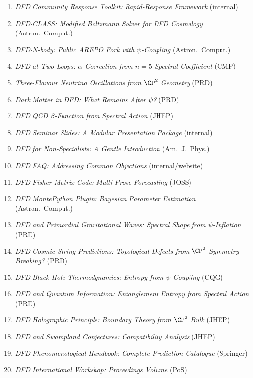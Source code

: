\documentclass[11pt,a4paper]{article}
\begin{document}
\begin{enumerate}[nosep]
\item \textit{DFD Community Response Toolkit: Rapid-Response Framework} (internal)
\item \textit{DFD-CLASS: Modified Boltzmann Solver for DFD Cosmology} (Astron.\ Comput.)
\item \textit{DFD-N-body: Public AREPO Fork with $\psi$-Coupling} (Astron.\ Comput.)
\item \textit{DFD at Two Loops: $\alpha$ Correction from $n=5$ Spectral Coefficient} (CMP)
\item \textit{Three-Flavour Neutrino Oscillations from $\CP^2$ Geometry} (PRD)
\item \textit{Dark Matter in DFD: What Remains After $\psi$?} (PRD)
\item \textit{DFD QCD $\beta$-Function from Spectral Action} (JHEP)
\item \textit{DFD Seminar Slides: A Modular Presentation Package} (internal)
\item \textit{DFD for Non-Specialists: A Gentle Introduction} (Am.\ J.\ Phys.)
\item \textit{DFD FAQ: Addressing Common Objections} (internal/website)
\item \textit{DFD Fisher Matrix Code: Multi-Probe Forecasting} (JOSS)
\item \textit{DFD MontePython Plugin: Bayesian Parameter Estimation} (Astron.\ Comput.)
\item \textit{DFD and Primordial Gravitational Waves: Spectral Shape from $\psi$-Inflation} (PRD)
\item \textit{DFD Cosmic String Predictions: Topological Defects from $\CP^2$ Symmetry Breaking?} (PRD)
\item \textit{DFD Black Hole Thermodynamics: Entropy from $\psi$-Coupling} (CQG)
\item \textit{DFD and Quantum Information: Entanglement Entropy from Spectral Action} (PRD)
\item \textit{DFD Holographic Principle: Boundary Theory from $\CP^2$ Bulk} (JHEP)
\item \textit{DFD and Swampland Conjectures: Compatibility Analysis} (JHEP)
\item \textit{DFD Phenomenological Handbook: Complete Prediction Catalogue} (Springer)
\item \textit{DFD International Workshop: Proceedings Volume} (PoS)
\end{enumerate}
\end{document}
